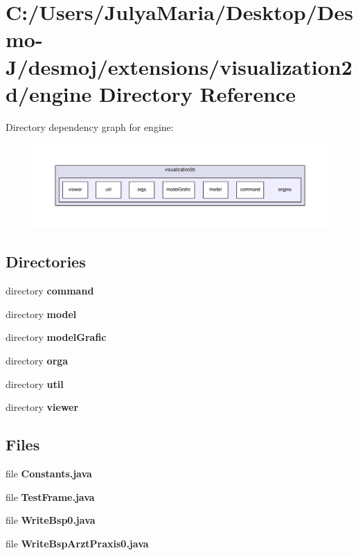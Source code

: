 \section{C\-:/\-Users/\-Julya\-Maria/\-Desktop/\-Desmo-\/\-J/desmoj/extensions/visualization2d/engine Directory Reference}
\label{dir_fc0831e103e1a932ef3c4c48d6ed73c5}
Directory dependency graph for engine\-:
\nopagebreak
\begin{figure}[H]
\begin{center}
\leavevmode
\includegraphics[width=350pt]{dir_fc0831e103e1a932ef3c4c48d6ed73c5_dep}
\end{center}
\end{figure}
\subsection*{Directories}
\begin{DoxyCompactItemize}
\item 
directory {\bf command}
\item 
directory {\bf model}
\item 
directory {\bf model\-Grafic}
\item 
directory {\bf orga}
\item 
directory {\bf util}
\item 
directory {\bf viewer}
\end{DoxyCompactItemize}
\subsection*{Files}
\begin{DoxyCompactItemize}
\item 
file {\bfseries Constants.\-java}
\item 
file {\bfseries Test\-Frame.\-java}
\item 
file {\bfseries Write\-Bsp0.\-java}
\item 
file {\bfseries Write\-Bsp\-Arzt\-Praxis0.\-java}
\end{DoxyCompactItemize}
